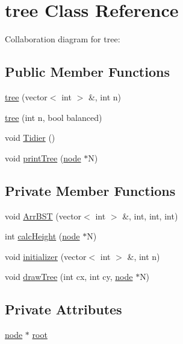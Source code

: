 \hypertarget{classtree}{}\section{tree Class Reference}
\label{classtree}


Collaboration diagram for tree\+:
\subsection*{Public Member Functions}
\begin{DoxyCompactItemize}
\item 
\mbox{\hyperlink{classtree_a943d10650f183701ae0414689c9b9ee8}{tree}} (vector$<$ int $>$ \&, int n)
\item 
\mbox{\hyperlink{classtree_a529a530e3787fdaee02ed65cbf1f17ff}{tree}} (int n, bool balanced)
\item 
void \mbox{\hyperlink{classtree_a3ab555be0649e279e130964b0c93e37a}{Tidier}} ()
\item 
void \mbox{\hyperlink{classtree_ab8fe7bb07ee399e9afc291bd458df225}{print\+Tree}} (\mbox{\hyperlink{structnode}{node}} $\ast$N)
\end{DoxyCompactItemize}
\subsection*{Private Member Functions}
\begin{DoxyCompactItemize}
\item 
void \mbox{\hyperlink{classtree_a85b5b76a25645f657e21f706f386286f}{Arr\+B\+ST}} (vector$<$ int $>$ \&, int, int, int)
\item 
int \mbox{\hyperlink{classtree_a796f88cacd055670fb3a9f7ce3cb38f2}{calc\+Height}} (\mbox{\hyperlink{structnode}{node}} $\ast$N)
\item 
void \mbox{\hyperlink{classtree_a22e44bf95c32d54a66e2a91ca74decb4}{initializer}} (vector$<$ int $>$ \&, int n)
\item 
void \mbox{\hyperlink{classtree_a09613a8cf3f28dfa51dfd06ceeb90fa0}{draw\+Tree}} (int cx, int cy, \mbox{\hyperlink{structnode}{node}} $\ast$N)
\end{DoxyCompactItemize}
\subsection*{Private Attributes}
\begin{DoxyCompactItemize}
\item 
\mbox{\hyperlink{structnode}{node}} $\ast$ \mbox{\hyperlink{classtree_ad397d4906e47149b98f769b3e81473ee}{root}}
\end{DoxyCompactItemize}


